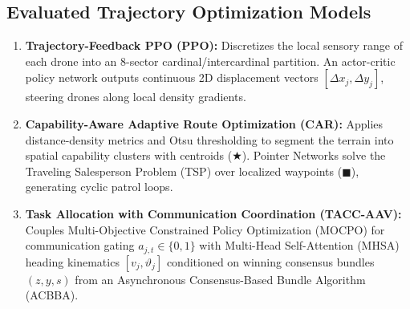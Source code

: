 \documentclass[journal]{IEEEtran}
\begin{document}
\subsection{Evaluated Trajectory Optimization Models}
\begin{enumerate}
    \item \textbf{Trajectory-Feedback PPO (PPO):} Discretizes the local sensory range of each drone into an $8$-sector cardinal/intercardinal partition. An actor-critic policy network outputs continuous 2D displacement vectors $[\Delta x_j, \Delta y_j]$, steering drones along local density gradients.
    \item \textbf{Capability-Aware Adaptive Route Optimization (CAR):} Applies distance-density metrics and Otsu thresholding to segment the terrain into spatial capability clusters with centroids ($\bigstar$). Pointer Networks solve the Traveling Salesperson Problem (TSP) over localized waypoints ($\blacksquare$), generating cyclic patrol loops.
    \item \textbf{Task Allocation with Communication Coordination (TACC-AAV):} Couples Multi-Objective Constrained Policy Optimization (MOCPO) for communication gating $a_{j,t} \in \{0, 1\}$ with Multi-Head Self-Attention (MHSA) heading kinematics $[v_j, \vartheta_j]$ conditioned on winning consensus bundles $(z, y, s)$ from an Asynchronous Consensus-Based Bundle Algorithm (ACBBA).
\end{enumerate}
\end{document}
